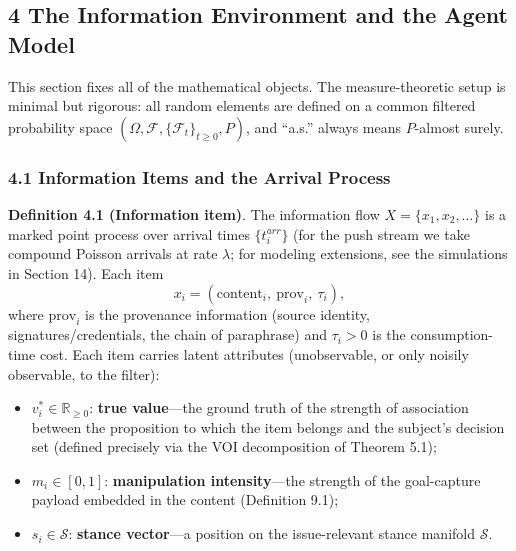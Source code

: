 \documentclass[
  11pt]{article}
\providecommand{\tightlist}{%
  \setlength{\itemsep}{0pt}\setlength{\parskip}{0pt}}
\begin{document}
\subsection{4 The Information Environment and the Agent
Model}\label{the-information-environment-and-the-agent-model}

This section fixes all of the mathematical objects. The
measure-theoretic setup is minimal but rigorous: all random elements are
defined on a common filtered probability space
\((\Omega, \mathcal{F}, \{\mathcal{F}_t\}_{t\ge0}, P)\), and ``a.s.''
always means \(P\)-almost surely.

\subsubsection{4.1 Information Items and the Arrival
Process}\label{information-items-and-the-arrival-process}

\textbf{Definition 4.1 (Information item)}. The information flow
\(X = \{x_1, x_2, \dots\}\) is a marked point process over arrival times
\(\{t_i^{arr}\}\) (for the push stream we take compound Poisson arrivals
at rate \(\lambda\); for modeling extensions, see the simulations in
Section 14). Each item
\[x_i = (\mathrm{content}_i,\ \mathrm{prov}_i,\ \tau_i),\] where
\(\mathrm{prov}_i\) is the provenance information (source identity,
signatures/credentials, the chain of paraphrase) and \(\tau_i > 0\) is
the consumption-time cost. Each item carries latent attributes
(unobservable, or only noisily observable, to the filter):

\begin{itemize}
\tightlist
\item
  \(v_i^* \in \mathbb{R}_{\ge 0}\): \textbf{true value}---the ground
  truth of the strength of association between the proposition to which
  the item belongs and the subject's decision set (defined precisely via
  the VOI decomposition of Theorem 5.1);
\item
  \(m_i \in [0,1]\): \textbf{manipulation intensity}---the strength of
  the goal-capture payload embedded in the content (Definition 9.1);
\item
  \(s_i \in \mathcal{S}\): \textbf{stance vector}---a position on the
  issue-relevant stance manifold \(\mathcal{S}\).
\end{itemize}
\end{document}

